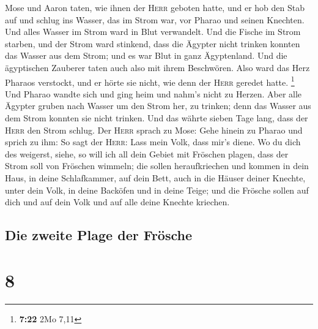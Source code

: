  Mose und Aaron taten, wie ihnen der \textsc{Herr}
geboten hatte, und er hob den Stab auf und schlug ins Wasser, das im
Strom war, vor Pharao und seinen Knechten. Und alles Wasser im Strom
ward in Blut verwandelt.  Und die Fische im Strom
starben, und der Strom ward stinkend, dass die Ägypter nicht trinken
konnten das Wasser aus dem Strom; und es war Blut in ganz Ägyptenland.
 Und die ägyptischen Zauberer taten auch also mit ihrem
Beschwören. Also ward das Herz Pharaos verstockt, und er hörte sie
nicht, wie denn der \textsc{Herr} geredet hatte. \footnote{\textbf{7:22}
  2Mo 7,11}  Und Pharao wandte sich und ging heim und
nahm's nicht zu Herzen.  Aber alle Ägypter gruben nach
Wasser um den Strom her, zu trinken; denn das Wasser aus dem Strom
konnten sie nicht trinken.  Und das währte sieben Tage
lang, dass der \textsc{Herr} den Strom schlug.  Der
\textsc{Herr} sprach zu Mose: Gehe hinein zu Pharao und sprich zu ihm:
So sagt der \textsc{Herr}: Lass mein Volk, dass mir's diene.
 Wo du dich des weigerst, siehe, so will ich all dein
Gebiet mit Fröschen plagen,  dass der Strom soll von
Fröschen wimmeln; die sollen heraufkriechen und kommen in dein Haus, in
deine Schlafkammer, auf dein Bett, auch in die Häuser deiner Knechte,
unter dein Volk, in deine Backöfen und in deine Teige; 
und die Frösche sollen auf dich und auf dein Volk und auf alle deine
Knechte kriechen.

\hypertarget{die-zweite-plage-der-fruxf6sche}{%
\subsection{Die zweite Plage der
Frösche}\label{die-zweite-plage-der-fruxf6sche}}

\hypertarget{section-7}{%
\section{8}\label{section-7}}

